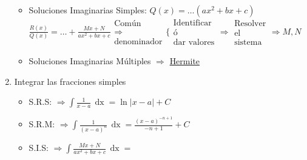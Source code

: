 \documentclass[a4paper,11pt]{article}
\DeclareMathOperator{\xder}{\, \mathrm{d}x}
\begin{document}
\begin{enumerate}
\begin{itemize}
						\item Soluciones Imaginarias Simples: $ Q(x) = \dots (a x^2 + b x + c) $
							$ \frac{R(x)}{Q(x)} = \dots +
							\frac{Mx + N}{a x^2 + b x + c}
							\begin{array}{c}
								\text{Común}\\
								\Rightarrow\\
								\text{denominador}
							\end{array}
							\Bigg \{
							\begin{array}{c}
								\text{Identificar}\\
								\text{ó}\\
								\text{dar valores}
							\end{array}
							\Rightarrow
							\begin{array}{c}
								\text{Resolver}\\
								\text{el}\\
								\text{sistema}
							\end{array} \Rightarrow M, N $
						\item Soluciones Imaginarias Múltiples $ \Rightarrow $ \underline{Hermite}
					\end{itemize} 

				\item Integrar las fracciones simples
					\begin{itemize}
						\item S.R.S: $ \Rightarrow \int \frac{1}{x-a} \xder = \ln |x-a| + C $
						\item S.R.M: $ \Rightarrow \int \frac{1}{(x-a)^n} \xder = \frac{(x-a)^{-n+1}}{-n+1} + C $
						\item S.I.S: $ \Rightarrow \int \frac{Mx+N}{a x^2 + b x + c} \xder = $
					\end{itemize}

			\end{enumerate}
\end{document}
